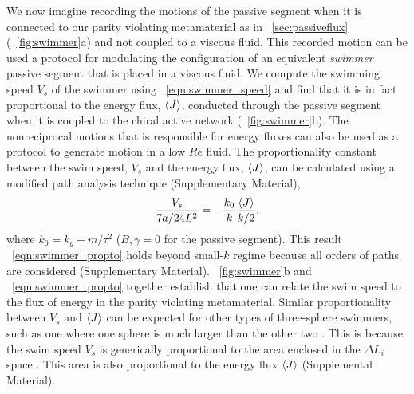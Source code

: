 \documentclass[
 preprint,
 preprintnumbers,
 amsmath,amssymb,
 aps,
 pre,
 longbibliography,
 superscriptaddress,
 10pt, twocolumn
]{revtex4-1}
\begin{document}
We now imagine recording the motions of the passive segment when it is connected to our parity violating metamaterial as in \secname~\ref{sec:passiveflux}(\figurename~\ref{fig:swimmer}a) and not coupled to a viscous fluid. This recorded motion can be used a protocol for modulating the configuration of an equivalent {\it swimmer} passive segment that is placed in a viscous fluid.
We compute the swimming speed $V_s$ of the swimmer using \eqnname~\ref{eqn:swimmer_speed} and find that it is in fact proportional to the energy flux, $\expval{J}$, conducted through the passive segment when it is coupled to the chiral active network (\figurename~\ref{fig:swimmer}b). The nonreciprocal motions that is responsible for energy fluxes can also be used as a protocol to generate motion in a low $Re$ fluid.
The proportionality constant between the swim speed, $V_s$ and the energy flux, $\expval{J}$, can be calculated using a modified path analysis technique (Supplementary Material),
\begin{equation} \label{eqn:swimmer_propto}
    \frac{V_s}{7a/24L^2} = -\frac{k_0}{k} \frac{\expval{J}}{k/2},
\end{equation}
where $k_0 = k_g + m/\tau^2$ ($B,\gamma=0$ for the passive segment).
This result \eqnname~\eqref{eqn:swimmer_propto} holds beyond small-$k$ regime because all orders of paths are considered (Supplementary Material).
\figurename~\ref{fig:swimmer}b and \eqnname~\eqref{eqn:swimmer_propto} together establish that one can relate the swim speed to the flux of energy in the parity violating metamaterial. 
Similar proportionality between $V_s$ and $\expval{J}$ can be expected for other types of three-sphere swimmers, such as one where one sphere is much larger than the other two \cite{Golestanian2008ThreesphereLowReynoldsnumber}. This is because the swim speed $V_s$ is generically proportional to the area enclosed in the $\Delta L_i$ space \cite{Golestanian2009StochasticLow}. This area is also proportional to the energy flux $\expval{J}$ (Supplemental Material).

\end{document}
